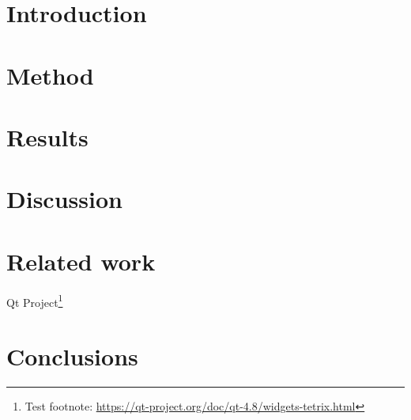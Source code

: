 \documentclass{ml}
\begin{document}

\section{Introduction}

\section{Method}

\section{Results}

\section{Discussion}

\section{Related work}
\cite{wwwtetrix}
Qt Project\footnote{Test footnote: \url{https://qt-project.org/doc/qt-4.8/widgets-tetrix.html}}

\section{Conclusions}

\newpage


\end{document}
